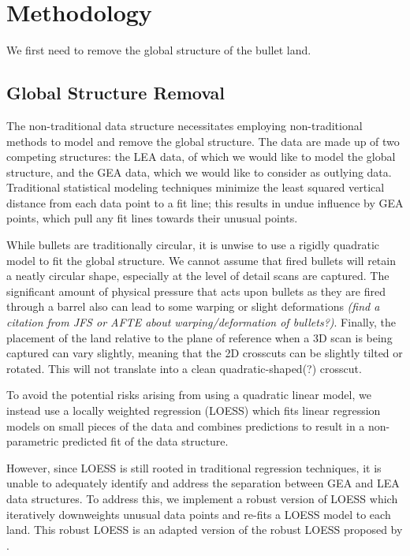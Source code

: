 \documentclass[12pt]{article}
\begin{document}
\section{Methodology}

We first need to remove the global structure of the bullet land.

\subsection{Global Structure Removal}

The non-traditional data structure necessitates employing
non-traditional methods to model and remove the global structure. The
data are made up of two competing structures: the LEA data, of which we
would like to model the global structure, and the GEA data, which we
would like to consider as outlying data. Traditional statistical
modeling techniques minimize the least squared vertical distance from
each data point to a fit line; this results in undue influence by GEA
points, which pull any fit lines towards their unusual points.

While bullets are traditionally circular, it is unwise to use a rigidly
quadratic model to fit the global structure. We cannot assume that fired
bullets will retain a neatly circular shape, especially at the level of
detail scans are captured. The significant amount of physical pressure
that acts upon bullets as they are fired through a barrel also can lead
to some warping or slight deformations \emph{(find a citation from JFS
or AFTE about warping/deformation of bullets?)}. Finally, the placement
of the land relative to the plane of reference when a 3D scan is being
captured can vary slightly, meaning that the 2D crosscuts can be
slightly tilted or rotated. This will not translate into a clean
quadratic-shaped(?) crosscut.

To avoid the potential risks arising from using a quadratic linear
model, we instead use a locally weighted regression (LOESS) which fits
linear regression models on small pieces of the data and combines
predictions to result in a non-parametric predicted fit of the data
structure.

However, since LOESS is still rooted in traditional regression
techniques, it is unable to adequately identify and address the
separation between GEA and LEA data structures. To address this, we
implement a robust version of LOESS which iteratively downweights
unusual data points and re-fits a LOESS model to each land. This robust
LOESS is an adapted version of the robust LOESS proposed by
\cite{Cleveland1}.
\end{document}
